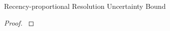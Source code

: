 \begin{theorem}{Recency-proportional Resolution Uncertainty Bound}
\label{thm:recency-proportional-resolution-algo-uncertainty-bound}

\end{theorem}

\begin{proof}
\label{prf:recency-proportional-resolution-algo-uncertainty-bound}

\end{proof}
